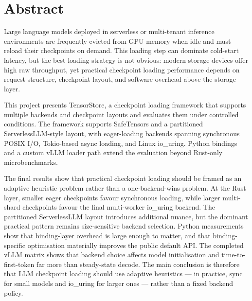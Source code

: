 \chapter*{Abstract}

Large language models deployed in serverless or multi-tenant inference environments are frequently evicted from GPU memory when idle and must reload their checkpoints on demand. This loading step can dominate cold-start latency, but the best loading strategy is not obvious: modern storage devices offer high raw throughput, yet practical checkpoint loading performance depends on request structure, checkpoint layout, and software overhead above the storage layer.

This project presents TensorStore, a checkpoint loading framework that supports multiple backends and checkpoint layouts and evaluates them under controlled conditions. The framework supports SafeTensors and a partitioned ServerlessLLM-style layout, with eager-loading backends spanning synchronous POSIX I/O, Tokio-based async loading, and Linux io\_uring. Python bindings and a custom vLLM loader path extend the evaluation beyond Rust-only microbenchmarks.

The final results show that practical checkpoint loading should be framed as an adaptive heuristic problem rather than a one-backend-wins problem. At the Rust layer, smaller eager checkpoints favour synchronous loading, while larger multi-shard checkpoints favour the final multi-worker io\_uring backend. The partitioned ServerlessLLM layout introduces additional nuance, but the dominant practical pattern remains size-sensitive backend selection. Python measurements show that binding-layer overhead is large enough to matter, and that binding-specific optimisation materially improves the public default API. The completed vLLM matrix shows that backend choice affects model initialisation and time-to-first-token far more than steady-state decode. The main conclusion is therefore that LLM checkpoint loading should use adaptive heuristics --- in practice, sync for small models and io\_uring for larger ones --- rather than a fixed backend policy.
